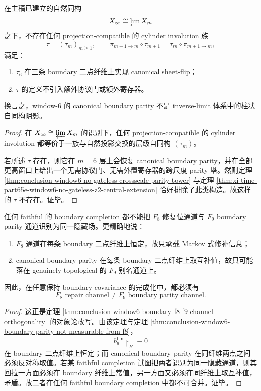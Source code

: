 \begin{theorem}\label{thm:conclusion-window6-no-inverse-limit-cylinder-parity-lift}
在主稿已建立的自然同构
\[
X_{\infty}\cong \varprojlim X_m
\]
之下，不存在任何 projection-compatible 的 cylinder involution 族
\[
\tau=(\tau_m)_{m\ge 1}
,\qquad
\pi_{m+1\to m}\circ \tau_{m+1}=\tau_m\circ \pi_{m+1\to m},
\]
满足：
\begin{enumerate}
  \item \(\tau_6\) 在三条 boundary 二点纤维上实现 canonical sheet-flip；
  \item \(\tau\) 的定义不引入额外协议门或额外寄存器。
\end{enumerate}
换言之，window-\(6\) 的 canonical boundary parity 不是 inverse-limit 体系中的柱状自同构阴影。
\end{theorem}
\begin{proof}
在 \(X_{\infty}\cong \varprojlim X_m\) 的识别下，任何 projection-compatible 的 cylinder involution 都等价于一族与自然投影交换的层级自同构 \((\tau_m)\)。

若所述 \(\tau\) 存在，则它在 \(m=6\) 层上会恢复 canonical boundary parity，并在全部更高窗口上给出一个无需协议门、无需外置寄存器的跨尺度 parity 塔。然则定理 \ref{thm:conclusion-window6-no-gateless-crossscale-parity-tower} 与定理 \ref{thm:xi-time-part65e-window6-no-gateless-z2-central-extension} 恰好排除了此类构造。故这样的 \(\tau\) 不存在。证毕。
\end{proof}

\begin{theorem}\label{thm:conclusion-window6-markov-topological-hidden-channel-separation}
任何 faithful 的 boundary completion 都不能把 \(F_8\) 修复位通道与 \(F_9\) boundary parity 通道识别为同一隐藏场。更精确地说：
\begin{enumerate}
  \item \(F_8\) 通道在每条 boundary 二点纤维上恒定，故只承载 Markov 式修补信息；
  \item canonical boundary parity 在每条 boundary 二点纤维上取互补值，故只可能落在 genuinely topological 的 \(F_9\) 别名通道上。
\end{enumerate}
因此，在任意保持 boundary-covariance 的完成化中，都必须有
\[
\text{\(F_8\) repair channel}\neq \text{\(F_9\) boundary parity channel}.
\]
\end{theorem}
\begin{proof}
这正是定理 \ref{thm:conclusion-window6-boundary-f8-f9-channel-orthogonality} 的对象论改写。由该定理与定理 \ref{thm:conclusion-window6-boundary-parity-not-measurable-from-f8}，
\[
b_6^{\mathrm{bin}}\!\restriction_B\equiv 0
\]
在 boundary 二点纤维上恒定；而 canonical boundary parity 在同纤维两点之间必须反对称取值。若某 faithful completion 试图把两者识别为同一隐藏通道，则其回拉一方面必须在 boundary 纤维上常值，另一方面又必须在同纤维上取互补值，矛盾。故二者在任何 faithful boundary completion 中都不可合并。证毕。
\end{proof}

